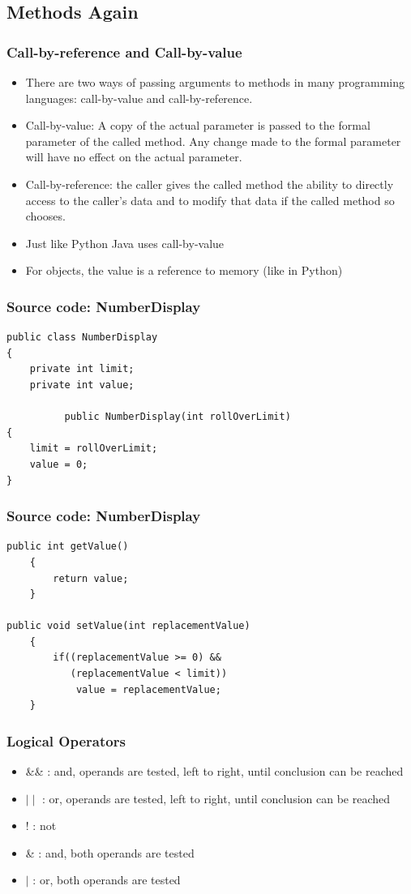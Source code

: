 \subsection{Methods Again}

\begin{frame}
\frametitle{Call-by-reference and Call-by-value}
\begin{itemize}
\item There are two ways of passing arguments to methods in many programming languages: call-by-value and call-by-reference.
\item Call-by-value: A copy of the actual parameter is passed to the formal parameter of the called method. Any change made to the formal parameter will have no effect on the actual parameter.
\item Call-by-reference: the caller gives the called method the ability to directly access to the caller’s data and to modify that data if the called method so chooses.
\item Just like Python Java uses call-by-value
\item For objects, the value is a reference to memory (like in Python)
\end{itemize}
\end{frame}

\begin{frame}[fragile]
\frametitle{Source code: NumberDisplay}
\codelist
\begin{lstlisting}
public class NumberDisplay
{
    private int limit;
    private int value;

          public NumberDisplay(int rollOverLimit)‏
{
    limit = rollOverLimit;
    value = 0;
}
\end{lstlisting}
\end{frame}

\begin{frame}[fragile]
\frametitle{Source code: NumberDisplay}
\codelist
\begin{lstlisting}
public int getValue()‏
    {
        return value;
    }

public void setValue(int replacementValue)‏
    {
        if((replacementValue >= 0) && 
           (replacementValue < limit))‏
            value = replacementValue;
    }
\end{lstlisting}
\end{frame}


\begin{frame}
\frametitle{Logical Operators}
\begin{itemize}
\item \&\& : and, operands are tested, left to right, until conclusion can be reached 
\item $\mid \mid$ : or, operands are tested, left to right, until conclusion can be reached
\item ! : not
\item \& : and, both operands are tested
\item $\mid$ : or, both operands are tested
\end{itemize}
\end{frame}

